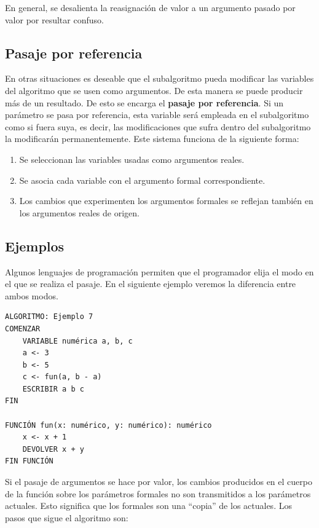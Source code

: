 \documentclass[]{book}
\providecommand{\tightlist}{%
  \setlength{\itemsep}{0pt}\setlength{\parskip}{0pt}}
\begin{document}
En general, se desalienta la reasignación de valor a un argumento pasado
por valor por resultar confuso.

\subsection{Pasaje por referencia}\label{pasaje-por-referencia}

En otras situaciones es deseable que el subalgoritmo pueda modificar las
variables del algoritmo que se usen como argumentos. De esta manera se
puede producir más de un resultado. De esto se encarga el \textbf{pasaje
por referencia}. Si un parámetro se pasa por referencia, esta variable
será empleada en el subalgoritmo como si fuera suya, es decir, las
modificaciones que sufra dentro del subalgoritmo la modificarán
permanentemente. Este sistema funciona de la siguiente forma:

\begin{enumerate}
\def\labelenumi{\arabic{enumi}.}
\tightlist
\item
  Se seleccionan las variables usadas como argumentos reales.
\item
  Se asocia cada variable con el argumento formal correspondiente.
\item
  Los cambios que experimenten los argumentos formales se reflejan
  también en los argumentos reales de origen.
\end{enumerate}

\subsection{Ejemplos}\label{ejemplos}

Algunos lenguajes de programación permiten que el programador elija el
modo en el que se realiza el pasaje. En el siguiente ejemplo veremos la
diferencia entre ambos modos.

\begin{verbatim}
ALGORITMO: Ejemplo 7
COMENZAR
    VARIABLE numérica a, b, c
    a <- 3
    b <- 5
    c <- fun(a, b - a)
    ESCRIBIR a b c
FIN

FUNCIÓN fun(x: numérico, y: numérico): numérico
    x <- x + 1
    DEVOLVER x + y
FIN FUNCIÓN
\end{verbatim}

Si el pasaje de argumentos se hace por valor, los cambios producidos en
el cuerpo de la función sobre los parámetros formales no son
transmitidos a los parámetros actuales. Esto significa que los formales
son una ``copia'' de los actuales. Los pasos que sigue el algoritmo son:
\end{document}
